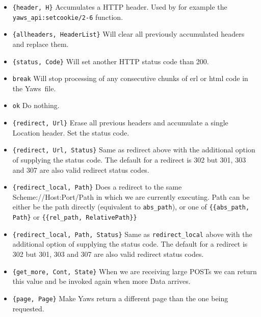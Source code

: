 \documentclass[11pt,oneside,english]{book}
\newcommand{\Yaws}            %
        {{\sc Yaws}}
\begin{document}
\begin{itemize}
\item       \verb+{header, H}+
              Accumulates a HTTP header. Used by for example  the
              \verb+yaws_api:setcookie/2-6+ function.

\item       \verb+{allheaders, HeaderList}+
              Will  clear  all previously accumulated headers and
              replace them.

\item       \verb+{status, Code}+
              Will set another HTTP status code than 200.

\item       \verb+break+  Will stop processing of any consecutive  chunks  of
              erl or html code in the \Yaws\  file.

\item       \verb+ok+     Do nothing.

\item       \verb+{redirect, Url}+
              Erase  all previous headers and accumulate a single
              Location header. Set the status code.

\item       \verb+{redirect, Url, Status}+
              Same as redirect above with the additional
	      option of supplying the status code. The default
	      for a redirect is 302 but 301, 303 and 307 are also
	      valid redirect status codes.

\item       \verb+{redirect_local, Path}+
              Does a redirect to the same Scheme://Host:Port/Path in
              which we are currently executing. Path can be either be
              the path directly (equivalent to \verb+abs_path+), or
              one of \verb+{{abs_path, Path}+ or
              \verb+{{rel_path, RelativePath}}+

\item       \verb+{redirect_local, Path, Status}+
              Same as \verb+redirect_local+ above with the additional
	      option of supplying the status code. The default
	      for a redirect is 302 but 301, 303 and 307 are also
	      valid redirect status codes.

\item       \verb+{get_more, Cont, State}+
              When  we  are  receiving  large POSTs we can return
              this value and be  invoked  again  when  more  Data
              arrives.

\item       \verb+{page, Page}+
              Make Yaws return a different page than the one being
              requested.


\end{itemize}
\end{document}
